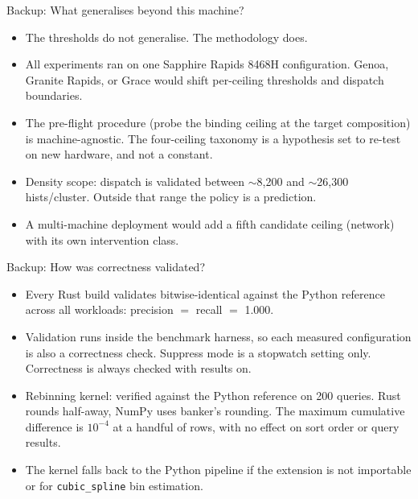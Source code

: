 \documentclass[aspectratio=169,10pt]{beamer}
\begin{document}
\begin{frame}{Backup: What generalises beyond this machine?}
  \begin{itemize}
    \item The thresholds do not generalise. The methodology does.
    \item All experiments ran on one Sapphire Rapids 8468H configuration. Genoa, Granite Rapids, or Grace would shift per-ceiling thresholds and dispatch boundaries.
    \item The pre-flight procedure (probe the binding ceiling at the target composition) is machine-agnostic. The four-ceiling taxonomy is a hypothesis set to re-test on new hardware, and not a constant.
    \item Density scope: dispatch is validated between $\sim$8{,}200 and $\sim$26{,}300 hists/cluster. Outside that range the policy is a prediction.
    \item A multi-machine deployment would add a fifth candidate ceiling (network) with its own intervention class.
  \end{itemize}
\end{frame}

\begin{frame}{Backup: How was correctness validated?}
  \begin{itemize}
    \item Every Rust build validates bitwise-identical against the Python reference across all workloads: precision $=$ recall $=$ 1.000.
    \item Validation runs inside the benchmark harness, so each measured configuration is also a correctness check. Suppress mode is a stopwatch setting only. Correctness is always checked with results on.
    \item Rebinning kernel: verified against the Python reference on 200 queries. Rust rounds half-away, NumPy uses banker's rounding. The maximum cumulative difference is $10^{-4}$ at a handful of rows, with no effect on sort order or query results.
    \item The kernel falls back to the Python pipeline if the extension is not importable or for \texttt{cubic\_spline} bin estimation.
  \end{itemize}
\end{frame}
\end{document}
